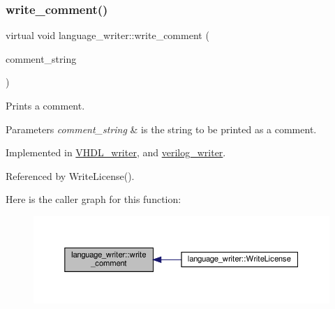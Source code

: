\subsubsection{\texorpdfstring{write\+\_\+comment()}{write\_comment()}}
{\footnotesize\ttfamily virtual void language\+\_\+writer\+::write\+\_\+comment (\begin{DoxyParamCaption}\item[{const std\+::string \&}]{comment\+\_\+string }\end{DoxyParamCaption})\hspace{0.3cm}{\ttfamily [pure virtual]}}



Prints a comment. 


\begin{DoxyParams}{Parameters}
{\em comment\+\_\+string} & is the string to be printed as a comment. \\
\hline
\end{DoxyParams}


Implemented in \hyperlink{structVHDL__writer_a9e5dd9daf73ae7621fd861dd1ad81f41}{V\+H\+D\+L\+\_\+writer}, and \hyperlink{classverilog__writer_ab013209d73c10f53c87bb1b7a2666ff0}{verilog\+\_\+writer}.



Referenced by Write\+License().

Here is the caller graph for this function\+:
\nopagebreak
\begin{figure}[H]
\begin{center}
\leavevmode
\includegraphics[width=350pt]{d6/d67/classlanguage__writer_acb35eb2c22883fcf1f479a091dc4429d_icgraph}
\end{center}
\end{figure}
\mbox{\label{classlanguage__writer_a99c30813a77c594298e9d4612d2a7e29}} 
